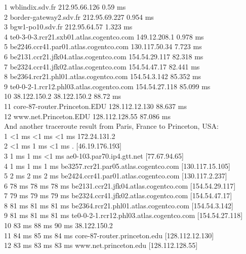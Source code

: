 \documentclass[titlepage, paper=a4, fontsize=11pt]{scrartcl} %
\numberwithin{equation}{section} %
\numberwithin{figure}{section} %
\numberwithin{table}{section} %
\begin{document}
1	wblindix.sdv.fr      	212.95.66.126      	0.59 ms \\
2	border-gateway2.sdv.fr      	212.95.69.227      	0.954 ms \\
3	bgw1-po10.sdv.fr      	212.95.64.57      	1.323 ms \\
4	te0-3-0-3.rcr21.sxb01.atlas.cogentco.com      	149.12.208.1      	0.978 ms \\
5	be2246.ccr41.par01.atlas.cogentco.com      	130.117.50.34      	7.723 ms \\
6	be2131.ccr21.jfk04.atlas.cogentco.com      	154.54.29.117      	82.318 ms \\
7	be2324.ccr41.jfk02.atlas.cogentco.com      	154.54.47.17      	82.441 ms \\
8	be2364.rcr21.phl01.atlas.cogentco.com      	154.54.3.142      	85.352 ms \\
9	te0-0-2-1.rcr12.phl03.atlas.cogentco.com      	154.54.27.118      	85.099 ms \\
10	38.122.150.2      	38.122.150.2      	88.72 ms \\
11	core-87-router.Princeton.EDU      	128.112.12.130      	88.637 ms \\
12	www.net.Princeton.EDU      	128.112.128.55      	87.086 ms
\\

And another traceroute result from Paris, France to Princeton, USA: \\

1    <1 ms    <1 ms    <1 ms  172.24.131.2 \\
2    <1 ms     1 ms    <1 ms  . [46.19.176.193] \\
3     1 ms     1 ms    <1 ms  ae0-103.par70.ip4.gtt.net [77.67.94.65] \\
4     1 ms     1 ms     1 ms  be3257.rcr21.par05.atlas.cogentco.com [130.117.15.105] \\
5     2 ms     2 ms     2 ms  be2424.ccr41.par01.atlas.cogentco.com [130.117.2.237] \\
6    78 ms    78 ms    78 ms  be2131.ccr21.jfk04.atlas.cogentco.com [154.54.29.117] \\
7    79 ms    79 ms    79 ms  be2324.ccr41.jfk02.atlas.cogentco.com [154.54.47.17] \\
8    81 ms    81 ms    81 ms  be2364.rcr21.phl01.atlas.cogentco.com [154.54.3.142] \\
9    81 ms    81 ms    81 ms  te0-0-2-1.rcr12.phl03.atlas.cogentco.com [154.54.27.118] \\
10    83 ms    88 ms    90 ms  38.122.150.2 \\
11    84 ms    85 ms    84 ms  core-87-router.princeton.edu [128.112.12.130] \\
12    83 ms    83 ms    83 ms  www.net.princeton.edu [128.112.128.55] 
\\
\end{document}
